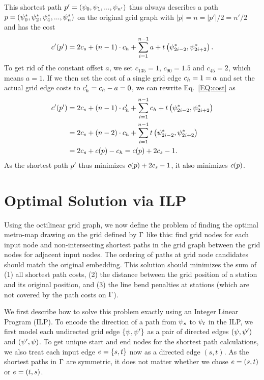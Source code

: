 \documentclass{sig-alternate-sigmod09}
\begin{document}
This shortest path $p' = (\psi_0, \psi_1, ..., \psi_{n'})$ thus always describes a path $p = (\psi^*_0, \psi^*_2, \psi^*_4, ..., \psi^*_{n})$ on the original grid graph with $|p| = n = |p'| / 2 = n' / 2$ and has the cost
%
\begin{align}
	c'(p') = 2 c_s + \left(n - 1\right) \cdot c_h + \sum_{i=1}^{n - 1} a + t\left(\psi^*_{2i - 2}, \psi^*_{2i+2}\right)\label{EQ:cost}.
\end{align}
%
To get rid of the constant offset $a$, we set $c_{135} = 1$, $c_{90} = 1.5$ and $c_{45} = 2$, which means $a = 1$.
If we then set the cost of a single grid edge $c_h = 1 = a$ and set the actual grid edge costs to $c'_h = c_h - a = 0$, we can rewrite Eq.~\ref{EQ:cost} as  
%
\begin{align}
	c'(p') &= 2 c_s +  \left(n - 1\right) \cdot c'_h + \sum_{i=1}^{n - 1} c_h + t\left(\psi^*_{2i - 2}, \psi^*_{2i+2}\right) \\
	     &= 2 c_s + \left(n - 2\right) \cdot c_h + \sum_{i=1}^{n - 1} t \left(\psi^*_{2i - 2}, \psi^*_{2i+2}\right) \\
	     &= 2 c_s + c(p) - c_h = c(p) + 2 c_s - 1.
\end{align}
%
As the shortest path $p'$ thus minimizes $c(p) + 2 c_s - 1$, it also minimizes $c(p)$.

\section{Optimal Solution via ILP}

Using the octilinear grid graph, we now define the problem of finding the optimal metro-map drawing on the grid defined by $\Gamma$ like this: find grid nodes for each input node and non-intersecting shortest paths in the grid graph between the grid nodes for adjacent input nodes.
The ordering of paths at grid node candidates should match the original embedding.
This solution should minimizes the sum of (1) all shortest path costs, (2) the distance between the grid position of a station and its original position, and (3) the line bend penalties at stations (which are not covered by the path costs on $\Gamma$).

We first describe how to solve this problem exactly using an Integer Linear Program (ILP).
To encode the direction of a path from $\psi_s$ to $\psi_t$ in the ILP, we first model each undirected grid edge $\{\psi, \psi'\}$ as a pair of directed edges $(\psi, \psi')$ and $(\psi', \psi)$.
To get unique start and end nodes for the shortest path calculations, we also treat each input edge $e = \{s, t\}$ now as a directed edge $(s, t)$.
As the shortest paths in $\Gamma$ are symmetric, it does not matter whether we chose $e = (s, t)$ or $e = (t, s)$.
\end{document}
